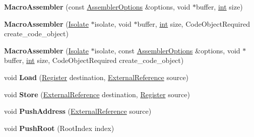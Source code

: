 \begin{DoxyCompactItemize}
{\bfseries Macro\+Assembler} (const \mbox{\hyperlink{structv8_1_1internal_1_1AssemblerOptions}{Assembler\+Options}} \&options, void $\ast$buffer, \mbox{\hyperlink{classint}{int}} size)
\item 
\mbox{\label{classv8_1_1internal_1_1MacroAssembler_ace8e2b09ca4bac1b40d12d84416284f9}} 
{\bfseries Macro\+Assembler} (\mbox{\hyperlink{classv8_1_1internal_1_1Isolate}{Isolate}} $\ast$isolate, void $\ast$buffer, \mbox{\hyperlink{classint}{int}} size, Code\+Object\+Required create\+\_\+code\+\_\+object)
\item 
\mbox{\label{classv8_1_1internal_1_1MacroAssembler_a118ab3d38490e9a50ee0157274ac3dc9}} 
{\bfseries Macro\+Assembler} (\mbox{\hyperlink{classv8_1_1internal_1_1Isolate}{Isolate}} $\ast$isolate, const \mbox{\hyperlink{structv8_1_1internal_1_1AssemblerOptions}{Assembler\+Options}} \&options, void $\ast$buffer, \mbox{\hyperlink{classint}{int}} size, Code\+Object\+Required create\+\_\+code\+\_\+object)
\item 
\mbox{\label{classv8_1_1internal_1_1MacroAssembler_a6237d57b7c2d24555920248be246119b}} 
void {\bfseries Load} (\mbox{\hyperlink{classv8_1_1internal_1_1Register}{Register}} destination, \mbox{\hyperlink{classv8_1_1internal_1_1ExternalReference}{External\+Reference}} source)
\item 
\mbox{\label{classv8_1_1internal_1_1MacroAssembler_a378985681605110c36eedb8d323fb27a}} 
void {\bfseries Store} (\mbox{\hyperlink{classv8_1_1internal_1_1ExternalReference}{External\+Reference}} destination, \mbox{\hyperlink{classv8_1_1internal_1_1Register}{Register}} source)
\item 
\mbox{\label{classv8_1_1internal_1_1MacroAssembler_a11a718f67f69f53ddfe32c0e10c9c5d3}} 
void {\bfseries Push\+Address} (\mbox{\hyperlink{classv8_1_1internal_1_1ExternalReference}{External\+Reference}} source)
\item 
\mbox{\label{classv8_1_1internal_1_1MacroAssembler_a91239e2f90525c993ce4dacef2b8219c}} 
void {\bfseries Push\+Root} (Root\+Index index)
\item 

\end{DoxyCompactItemize}
